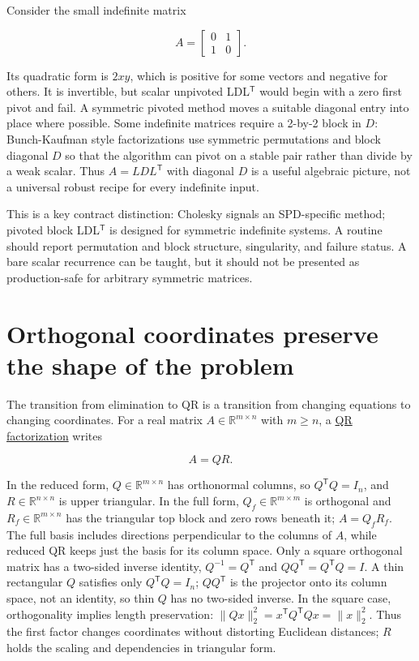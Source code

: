 Consider the small indefinite matrix

\[
A=\begin{bmatrix}0&1\\1&0\end{bmatrix}.
\]

Its quadratic form is \(2xy\), which is positive for some vectors and negative for others. It is invertible, but scalar unpivoted LDL\(^\mathsf T\) would begin with a zero first pivot and fail. A symmetric pivoted method moves a suitable diagonal entry into place where possible. Some indefinite matrices require a 2-by-2 block in \(D\): Bunch-Kaufman style factorizations use symmetric permutations and block diagonal \(D\) so that the algorithm can pivot on a stable pair rather than divide by a weak scalar. Thus \(A=LDL^\mathsf T\) with diagonal \(D\) is a useful algebraic picture, not a universal robust recipe for every indefinite input.

This is a key contract distinction: Cholesky signals an SPD-specific method; pivoted block LDL\(^\mathsf T\) is designed for symmetric indefinite systems. A routine should report permutation and block structure, singularity, and failure status. A bare scalar recurrence can be taught, but it should not be presented as production-safe for arbitrary symmetric matrices.

\section{Orthogonal coordinates preserve the shape of the problem}\label{01-foundations-i-ch020-orthogonal-coordinates-preserve-the-shape-of-the-problem}

The transition from elimination to QR is a transition from changing equations to changing coordinates. For a real matrix \(A\in\mathbb R^{m\times n}\) with \(m\ge n\), a \hyperref[01-foundations-i-ch020-reflections-and-plane-rotations-build-qr-without-losing-lengths]{QR factorization} writes

\[
A=QR.
\]

In the reduced form, \(Q\in\mathbb R^{m\times n}\) has orthonormal columns, so \(Q^\mathsf TQ=I_n\), and \(R\in\mathbb R^{n\times n}\) is upper triangular. In the full form, \(Q_f\in\mathbb R^{m\times m}\) is orthogonal and \(R_f\in\mathbb R^{m\times n}\) has the triangular top block and zero rows beneath it; \(A=Q_fR_f\). The full basis includes directions perpendicular to the columns of \(A\), while reduced QR keeps just the basis for its column space. Only a square orthogonal matrix has a two-sided inverse identity, \(Q^{-1}=Q^\mathsf T\) and \(QQ^\mathsf T=Q^\mathsf TQ=I\). A thin rectangular \(Q\) satisfies only \(Q^\mathsf TQ=I_n\); \(QQ^\mathsf T\) is the projector onto its column space, not an identity, so thin \(Q\) has no two-sided inverse. In the square case, orthogonality implies length preservation: \(\|Qx\|_2^2=x^\mathsf TQ^\mathsf TQx=\|x\|_2^2\). Thus the first factor changes coordinates without distorting Euclidean distances; \(R\) holds the scaling and dependencies in triangular form.

